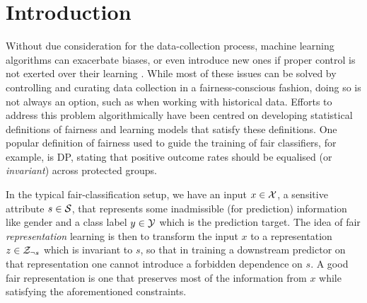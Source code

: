\section{Introduction}
%
Without due consideration for the data-collection process, machine learning algorithms can
exacerbate biases, or even introduce new ones if proper control is not exerted over their learning
\citep{holstein2019improving}. 
%
While most of these issues can be solved by controlling and curating data collection in a
fairness-conscious fashion, doing so is not always an option, such as when working with historical
data. 
%
Efforts to address this problem algorithmically have been centred on developing statistical
definitions of fairness and learning models that satisfy these definitions. 
%
One popular definition of fairness used to guide the training of fair classifiers, for example, is
\acf{DP}, stating that positive outcome rates should be equalised (or
\emph{invariant}) across protected groups.

In the typical fair-classification setup, we have an input $x \in {\mathcal{X}}$, a sensitive attribute $s
\in {\mathcal{S}}$, that represents some inadmissible (for prediction) information like gender and a class
label $y \in {\mathcal{Y}}$ which is the prediction target. 
%
The idea of fair \emph{representation} learning
\citep{zemel2013learning,edwards2016censoring,madras2018learning} is then to transform the input
$x$ to a representation $z \in {\mathcal{Z}}_{\neg s}$ which is invariant to $s$, so that in training a
downstream predictor on that representation one cannot introduce a forbidden dependence on $s$.
A good fair representation is one that preserves most of the information from $x$ while
satisfying the aforementioned constraints.

